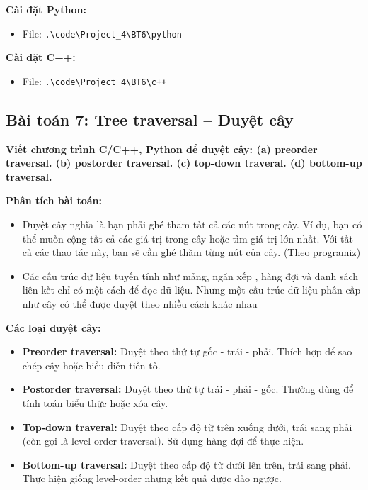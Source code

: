 \documentclass[12pt,a4paper]{article}
\begin{document}
\textbf{Cài đặt Python:}
\begin{itemize}[label=\textbullet]
    \item File: \texttt{.\textbackslash code\textbackslash Project\_4\textbackslash BT6\textbackslash python}
\end{itemize}

\textbf{Cài đặt C++:}
\begin{itemize}[label=\textbullet]
    \item File: \texttt{.\textbackslash code\textbackslash Project\_4\textbackslash BT6\textbackslash c++}
\end{itemize}

\subsection{Bài toán 7: Tree traversal – Duyệt cây}

\begin{problembox}
    \textbf{Viết chương trình C/C++, Python để duyệt cây: (a) preorder traversal. (b) postorder
traversal. (c) top-down traveral. (d) bottom-up traversal.} 
\end{problembox}

\textbf{Phân tích bài toán:}

\begin{itemize}[label=\textbullet]
    \item Duyệt cây nghĩa là bạn phải ghé thăm tất cả các nút trong cây. Ví dụ, bạn có thể muốn cộng tất cả các giá trị trong cây hoặc tìm giá trị lớn nhất. Với tất cả các thao tác này, bạn sẽ cần ghé thăm từng nút của cây. (Theo programiz)
    \item Các cấu trúc dữ liệu tuyến tính như mảng, ngăn xếp , hàng đợi và danh sách liên kết chỉ có một cách để đọc dữ liệu. Nhưng một cấu trúc dữ liệu phân cấp như cây có thể được duyệt theo nhiều cách khác nhau

\end{itemize}

\textbf{Các loại duyệt cây:}

\begin{itemize}[label=\textbullet]
    \item \textbf{Preorder traversal:} Duyệt theo thứ tự gốc - trái - phải. Thích hợp để sao chép cây hoặc biểu diễn tiền tố.
    \item \textbf{Postorder traversal:} Duyệt theo thứ tự trái - phải - gốc. Thường dùng để tính toán biểu thức hoặc xóa cây.
    \item \textbf{Top-down traveral:} Duyệt theo cấp độ từ trên xuống dưới, trái sang phải (còn gọi là level-order traversal). Sử dụng hàng đợi để thực hiện.
    \item \textbf{Bottom-up traversal:} Duyệt theo cấp độ từ dưới lên trên, trái sang phải. Thực hiện giống level-order nhưng kết quả được đảo ngược.
\end{itemize}
\end{document}
